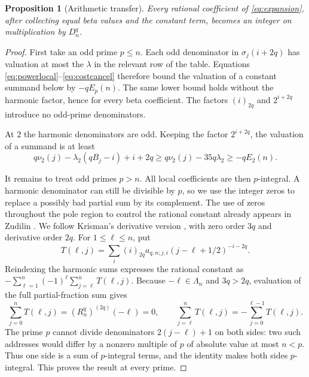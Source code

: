 \documentclass[11pt]{article}
\newtheorem{proposition}[theorem]{Proposition}
\begin{document}
\begin{proposition}[Arithmetic transfer]\label{prop:arithmetic}
Every rational coefficient of \eqref{eq:expansion}, after collecting equal
beta values and the constant term, becomes an integer on multiplication
by $D_n^q$.
\end{proposition}
\begin{proof}
First take an odd prime $p\le n$. Each odd denominator in
$\sigma_j(i+2q)$ has valuation at most the $\lambda$ in the relevant
row of the table. Equations \eqref{eq:powerlocal}--\eqref{eq:costcancel}
therefore bound the valuation of a constant summand below by $-qE_p(n)$.
The same lower bound holds without the harmonic factor, hence for every
beta coefficient. The factors $(i)_{2q}$ and $2^{i+2q}$ introduce no
odd-prime denominators.

At $2$ the harmonic denominators are odd. Keeping the factor $2^{i+2q}$,
the valuation of a summand is at least
\[
 q\nu_2(j)-\lambda_2(qB_j-i)+i+2q
       \ge q\nu_2(j)-35q\lambda_2\ge-qE_2(n).
\]

It remains to treat odd primes $p>n$. All local coefficients are then
$p$-integral. A harmonic denominator can still be divisible by $p$, so
we use the integer zeros to replace a possibly bad partial sum by its
complement. The use of zeros throughout the pole region to control the
rational constant already appears in Zudilin
\cite[proof of Lemma 1]{zudilin}. We follow Krisman's derivative version
\cite[Lemma 4.6]{krisman}, with zero order $3q$ and derivative order $2q$.
For $1\le\ell\le n$, put
\[
 T(\ell,j)=\sum_i(i)_{2q}a_{q,n;j,i}(j-\ell+1/2)^{-i-2q}.
\]
Reindexing the harmonic sums expresses the rational constant as
$-\sum_{\ell=1}^n(-1)^\ell\sum_{j=\ell}^nT(\ell,j)$.
Because $-\ell\in\Lambda_n$ and $3q>2q$, evaluation of the full
partial-fraction sum gives
\[
 \sum_{j=0}^nT(\ell,j)=(R_n^q)^{(2q)}(-\ell)=0,
 \qquad
 \sum_{j=\ell}^nT(\ell,j)=-\sum_{j=0}^{\ell-1}T(\ell,j).
\]
The prime $p$ cannot divide denominators $2(j-\ell)+1$ on both sides:
two such addresses would differ by a nonzero multiple of $p$ of absolute
value at most $n<p$. Thus one side is a sum of $p$-integral terms, and
the identity makes both sides $p$-integral. This proves the result at
every prime.
\end{proof}
\end{document}
